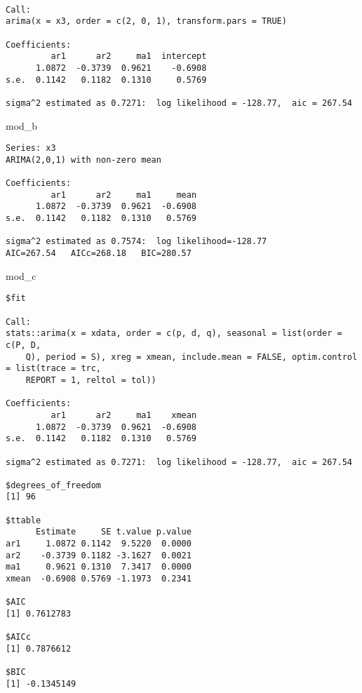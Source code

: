 \documentclass[]{book}
\newenvironment{Shaded}{\begin{snugshade}}{\end{snugshade}}
\newcommand{\NormalTok}[1]{#1}
\begin{document}
\begin{verbatim}

Call:
arima(x = x3, order = c(2, 0, 1), transform.pars = TRUE)

Coefficients:
         ar1      ar2     ma1  intercept
      1.0872  -0.3739  0.9621    -0.6908
s.e.  0.1142   0.1182  0.1310     0.5769

sigma^2 estimated as 0.7271:  log likelihood = -128.77,  aic = 267.54
\end{verbatim}

\begin{Shaded}
\begin{Highlighting}[]
\NormalTok{mod_b}
\end{Highlighting}
\end{Shaded}

\begin{verbatim}
Series: x3 
ARIMA(2,0,1) with non-zero mean 

Coefficients:
         ar1      ar2     ma1     mean
      1.0872  -0.3739  0.9621  -0.6908
s.e.  0.1142   0.1182  0.1310   0.5769

sigma^2 estimated as 0.7574:  log likelihood=-128.77
AIC=267.54   AICc=268.18   BIC=280.57
\end{verbatim}

\begin{Shaded}
\begin{Highlighting}[]
\NormalTok{mod_c}
\end{Highlighting}
\end{Shaded}

\begin{verbatim}
$fit

Call:
stats::arima(x = xdata, order = c(p, d, q), seasonal = list(order = c(P, D, 
    Q), period = S), xreg = xmean, include.mean = FALSE, optim.control = list(trace = trc, 
    REPORT = 1, reltol = tol))

Coefficients:
         ar1      ar2     ma1    xmean
      1.0872  -0.3739  0.9621  -0.6908
s.e.  0.1142   0.1182  0.1310   0.5769

sigma^2 estimated as 0.7271:  log likelihood = -128.77,  aic = 267.54

$degrees_of_freedom
[1] 96

$ttable
      Estimate     SE t.value p.value
ar1     1.0872 0.1142  9.5220  0.0000
ar2    -0.3739 0.1182 -3.1627  0.0021
ma1     0.9621 0.1310  7.3417  0.0000
xmean  -0.6908 0.5769 -1.1973  0.2341

$AIC
[1] 0.7612783

$AICc
[1] 0.7876612

$BIC
[1] -0.1345149
\end{verbatim}
\end{document}
